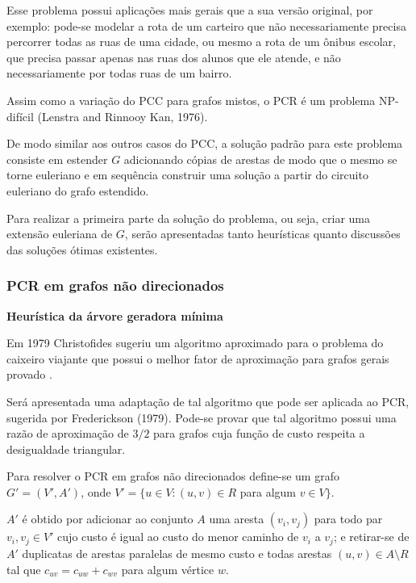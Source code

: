 \documentclass[12pt, a4paper]{article}
\begin{document}
    Esse problema possui aplicações mais gerais que a sua versão original, por exemplo: pode-se modelar a rota de um carteiro que não necessariamente precisa percorrer todas as ruas de uma cidade, ou mesmo a rota de um ônibus escolar, que precisa passar apenas nas ruas dos alunos que ele atende, e não necessariamente por todas ruas de um bairro.

    Assim como a variação do PCC para grafos mistos, o PCR é um problema NP-difícil  (Lenstra and Rinnooy Kan, 1976).

    De modo similar aos outros casos do PCC, a solução padrão para este problema consiste em estender $G$ adicionando cópias de arestas de modo que o mesmo se torne euleriano e em sequência construir uma solução a partir do circuito euleriano do grafo estendido.

    Para realizar a primeira parte da solução do problema, ou seja, criar uma extensão euleriana de $G$, serão apresentadas tanto heurísticas quanto discussões das soluções ótimas existentes.

        \subsubsection{PCR em grafos não direcionados}


        \textbf{Heurística da árvore geradora mínima}

        Em 1979 Christofides sugeriu um algoritmo aproximado para o problema do caixeiro viajante que possui o melhor fator de aproximação para grafos gerais provado \cite{wiki-christofides}. %

        Será apresentada uma adaptação de tal algoritmo que pode ser aplicada ao PCR, sugerida por Frederickson (1979).
        Pode-se provar que tal algoritmo possui uma razão de aproximação de $3/2$ para grafos cuja função de custo respeita a desigualdade triangular. 

        Para resolver o PCR em grafos não direcionados define-se um grafo $G' = (V', A')$, onde $V' = \{ u \in V : (u, v) \in R$ para algum $v \in V\}$.

        $A'$ é obtido por adicionar ao conjunto $A$ uma aresta $(v_i, v_j)$ para todo par $v_i, v_j \in V'$ cujo custo é igual ao custo do menor caminho de $v_i$ a $v_j$; e retirar-se de $A'$ duplicatas de arestas paralelas de mesmo custo e todas arestas $(u, v) \in A \setminus R$ tal que $c_{uv} = c_{uw} + c_{wv}$ para algum vértice $w$.
\end{document}
